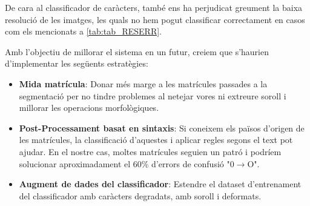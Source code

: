 De cara al classificador de caràcters, també ens ha perjudicat greument la baixa resolució de les imatges, les quals no hem pogut classificar correctament en casos com els mencionats a \ref{tab:tab_RESERR}.

Amb l'objectiu de millorar el sistema en un futur, creiem que s'haurien d'implementar les següents estratègies:
\begin{itemize}
    \item \textbf{Mida matrícula}: Donar més marge a les matrícules passades a la segmentació per no tindre problemes al netejar vores ni extreure soroll i millorar les operacions morfològiques.
    \item \textbf{Post-Processament basat en sintaxis}: Si coneixem els països d'origen de les matrícules, la classificació d'aquestes i aplicar regles segons el text pot ajudar. En el nostre cas, moltes matrícules seguien un patró i podríem solucionar aproximadament el 60\% d'errors de confusió "0$\rightarrow$O".
    \item \textbf{Augment de dades del classificador}: Estendre el dataset d'entrenament del classificador amb caràcters degradats, amb soroll i deformats.
\end{itemize}